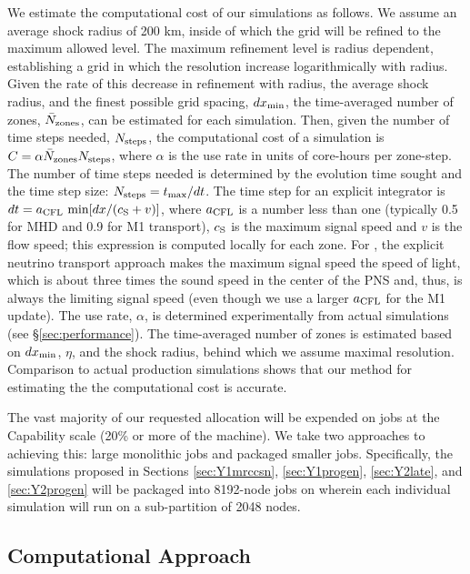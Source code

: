 We estimate the computational cost of our
simulations as follows.  We
assume an average shock radius of 200 km, inside of which the grid
will be refined to the maximum allowed level.
The maximum refinement level is radius dependent, establishing a grid in which the resolution increase logarithmically with radius.
Given the rate of this decrease in refinement with radius, the
average shock radius, and the finest possible grid spacing, $d
x_{\rm min}$, the time-averaged number of zones, $\bar N_{\rm zones}$,
can be estimated for each simulation.  Then, given the number of time
steps needed, $N_{\rm steps}$, the computational cost of a simulation
is $C = \alpha   \bar N_{\rm zones} N_{\rm steps}$,
where $\alpha$ is the use rate in units of core-hours per zone-step.
The number of time steps needed is determined by the
evolution time sought and the time step size: $N_{\rm steps} = t_{\rm
  max} / d t$.
The time step for an explicit integrator is $d t = a_{\rm CFL}\ {\rm min}[d x / (c_{\rm S} + v)]$, where $a_{\rm CFL}$ is a number less than one (typically 0.5 for MHD and 0.9 for M1 transport), $c_{\rm S}$ is the maximum signal speed and $v$ is the flow speed; this expression is computed locally for each zone.
For \sparkmone, the explicit neutrino transport approach makes the maximum signal speed the speed of light, which is about three times the sound speed in the center of the PNS and, thus, is always the limiting signal speed (even though we use a larger $a_{\rm CFL}$ for the M1 update).
The use rate, $\alpha$, is determined experimentally from actual simulations (see \S\ref{sec:performance}).  The time-averaged number of zones is estimated based on $d x_{\rm min}$, $\eta$, and the shock radius, behind which we assume maximal resolution.  Comparison to actual production simulations shows that our method for estimating the the computational cost is accurate.

The vast majority of our requested allocation will be expended on jobs at the Capability scale (20\% or more of the machine).
We take two approaches to achieving this: large monolithic jobs and packaged smaller jobs.
Specifically, the simulations proposed in Sections \ref{sec:Y1mrccsn}, \ref{sec:Y1progen}, \ref{sec:Y2late}, and \ref{sec:Y2progen} will be packaged into 8192-node jobs on \mira wherein each individual simulation will run on a sub-partition of 2048 nodes.


\subsection{Computational Approach}
\label{sec:approach}

